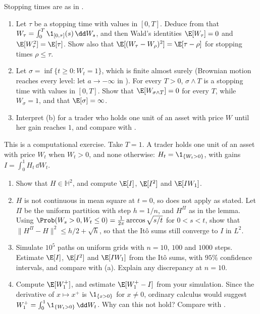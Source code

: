 \begin{exercise}\label{ex:ito-stopping}
\medium Stopping times are as in .
\begin{enumerate}[label=(\alph*)]
  \item Let $\tau$ be a stopping time with values in $[0,T]$. Deduce from
     that $W_\tau=\int_0^T\1_{[0,\tau]}(s)\,\dd W_s$, and then Wald's
    identities $\E[W_\tau]=0$ and $\E[W_\tau^2]=\E[\tau]$. Show also that
    $\E[(W_\tau-W_\rho)^2]=\E[\tau-\rho]$ for stopping times $\rho\le\tau$.
  \item Let $\sigma=\inf\{t\ge0:W_t=1\}$, which is finite almost surely (Brownian motion reaches
    every level: let $a\to-\infty$ in ). For every $T>0$, $\sigma\wedge T$ is a
    stopping time with values in $[0,T]$. Show that $\E[W_{\sigma\wedge T}]=0$ for every $T$,
    while $W_\sigma=1$, and that $\E[\sigma]=\infty$.
  \item Interpret (b) for a trader who holds one unit of an asset with price $W$ until her gain
    reaches $1$, and compare with .
\end{enumerate}
\end{exercise}

\begin{exercise}\label{ex:ito-positive}
\medium This is a computational exercise. Take $T=1$. A trader holds one unit of an asset with
price $W_t$ when $W_t>0$, and none otherwise: $H_t=\1_{\{W_t>0\}}$, with gains
$I=\int_0^1H_t\,\dd W_t$.
\begin{enumerate}[label=(\alph*)]
  \item Show that $H\in\mathbb H^2$, and compute $\E[I]$, $\E[I^2]$ and $\E[IW_1]$.
  \item $H$ is not continuous in mean square at $t=0$, so  does not
    apply as stated. Let $\Pi$ be the uniform partition with step $h=1/n$, and $H^\Pi$ as in
    the lemma. Using $\Prob(W_s>0,W_t\le0)=\frac1{2\pi}\arccos\sqrt{s/t}$ for $0<s<t$, show
    that $\|H^\Pi-H\|^2\le h/2+\sqrt h$, so that the It\^o sums still converge to $I$ in
    $L^2$.
  \item Simulate $10^5$ paths on uniform grids with $n=10$, $100$ and $1000$ steps. Estimate
    $\E[I]$, $\E[I^2]$ and $\E[IW_1]$ from the It\^o sums, with $95\%$ confidence intervals,
    and compare with (a). Explain any discrepancy at $n=10$.
  \item Compute $\E[W_1^+]$, and estimate $\E[W_1^+-I]$ from your simulation. Since the
    derivative of $x\mapsto x^+$ is $\1_{\{x>0\}}$ for $x\neq0$, ordinary calculus would
    suggest $W_1^+=\int_0^1\1_{\{W_t>0\}}\,\dd W_t$. Why can this not hold? Compare with
    .
\end{enumerate}
\end{exercise}
